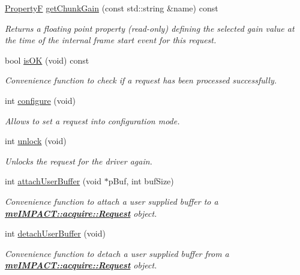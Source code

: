 \begin{DoxyCompactItemize}
\hyperlink{group___common_interface_gaf54865fe5a3d5cfd15f9a111b40d09f9}{Property\+F} \hyperlink{classmv_i_m_p_a_c_t_1_1acquire_1_1_request_ad3582f4b4f56c3abe5c0056b8a01ce98}{get\+Chunk\+Gain} (const std\+::string \&name) const 
\begin{DoxyCompactList}\small\item\em Returns a floating point property {\bfseries }(read-\/only) defining the selected gain value at the time of the internal frame start event for this request. \end{DoxyCompactList}\item 
bool \hyperlink{classmv_i_m_p_a_c_t_1_1acquire_1_1_request_a7120b640d76a3f8ed3711a8a773ad4be}{is\+O\+K} (void) const 
\begin{DoxyCompactList}\small\item\em Convenience function to check if a request has been processed successfully. \end{DoxyCompactList}\item 
int \hyperlink{classmv_i_m_p_a_c_t_1_1acquire_1_1_request_a5ad02aed16acd60699f3d8757c63af43}{configure} (void)
\begin{DoxyCompactList}\small\item\em Allows to set a request into configuration mode. \end{DoxyCompactList}\item 
int \hyperlink{classmv_i_m_p_a_c_t_1_1acquire_1_1_request_a3c30ced407d20caef49e3148257cd91e}{unlock} (void)
\begin{DoxyCompactList}\small\item\em Unlocks the request for the driver again. \end{DoxyCompactList}\item 
int \hyperlink{classmv_i_m_p_a_c_t_1_1acquire_1_1_request_acd8f58a136dafcb2bae251da383e2b18}{attach\+User\+Buffer} (void $\ast$p\+Buf, int buf\+Size)
\begin{DoxyCompactList}\small\item\em Convenience function to attach a user supplied buffer to a {\bfseries \hyperlink{classmv_i_m_p_a_c_t_1_1acquire_1_1_request}{mv\+I\+M\+P\+A\+C\+T\+::acquire\+::\+Request}} object. \end{DoxyCompactList}\item 
int \hyperlink{classmv_i_m_p_a_c_t_1_1acquire_1_1_request_a154f54b267a1d9860d1206b2138ef8d0}{detach\+User\+Buffer} (void)
\begin{DoxyCompactList}\small\item\em Convenience function to detach a user supplied buffer from a {\bfseries \hyperlink{classmv_i_m_p_a_c_t_1_1acquire_1_1_request}{mv\+I\+M\+P\+A\+C\+T\+::acquire\+::\+Request}} object. \end{DoxyCompactList}\end{DoxyCompactItemize}
